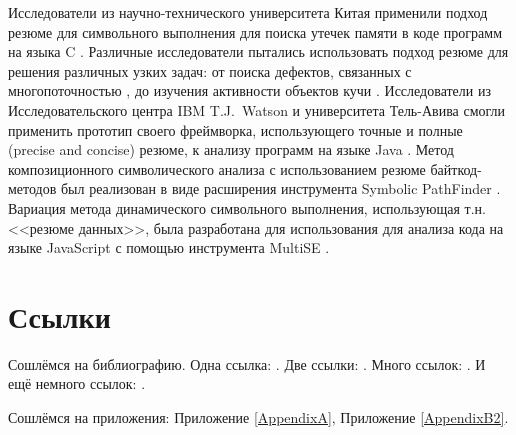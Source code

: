 Исследователи из научно-технического университета Китая применили подход резюме для символьного выполнения для поиска утечек памяти в коде программ на языка C \cite{melton}. Различные исследователи пытались использовать подход резюме для решения различных узких задач: от поиска дефектов, связанных с многопоточностью \cite{summary-concurrent}, до изучения активности объектов кучи \cite{summary-heap}. Исследователи из Исследовательского центра IBM T.J.~Watson и университета Тель-Авива смогли применить прототип своего фреймворка, использующего точные и полные (precise and concise) резюме, к анализу программ на языке Java \cite{precise-summary}. Метод композиционного символического анализа с использованием резюме байткод-методов был реализован в виде расширения инструмента Symbolic PathFinder \cite{compos-dse}. Вариация метода динамического символьного выполнения, использующая т.н. <<резюме данных>>, была разработана для использования для анализа кода на языке JavaScript с помощью инструмента MultiSE \cite{multi-se}.


\section{Ссылки} \label{sect1_2}
Сошлёмся на библиографию. Одна ссылка: \cite[с.~54]{Sokolov}\cite[с.~36]{Gaidaenko}. Две ссылки: \cite{Sokolov,Gaidaenko}. Много ссылок:  \cite[с.~54]{Lermontov,Management,Borozda} \cite{Lermontov,Management,Borozda,Marketing,Constitution,FamilyCode,Gost.7.0.53,Razumovski,Lagkueva,Pokrovski,Sirotko,Lukina,Methodology,Encyclopedia,Nasirova,Berestova,Kriger}. И ещё немного ссылок: \cite{Article,Book,Booklet,Conference,Inbook,Incollection,Manual,Mastersthesis,Misc,Phdthesis,Proceedings,Techreport,Unpublished}. \cite{medvedev2006jelektronnye, CEAT:CEAT581, doi:10.1080/01932691.2010.513279,Gosele1999161,Li2007StressAnalysis, Shoji199895,test:eisner-sample,AB_patent_Pomerantz_1968,iofis_patent1960}




Сошлёмся на приложения: Приложение \ref{AppendixA}, Приложение \ref{AppendixB2}.


